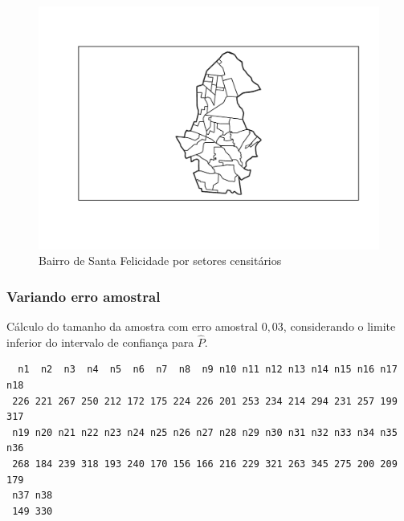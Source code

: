 \documentclass[12pt]{article}\usepackage[]{graphicx}\usepackage[]{color}
\makeatletter
\newenvironment{kframe}{%
 \def\at@end@of@kframe{}%
 \ifinner\ifhmode%
  \def\at@end@of@kframe{\end{minipage}}%
  \begin{minipage}{\columnwidth}%
 \fi\fi%
 \def\FrameCommand##1{\hskip\@totalleftmargin \hskip-\fboxsep
 \colorbox{shadecolor}{##1}\hskip-\fboxsep
     \hskip-\linewidth \hskip-\@totalleftmargin \hskip\columnwidth}%
 \MakeFramed {\advance\hsize-\width
   \@totalleftmargin\z@ \linewidth\hsize
   \@setminipage}}%
 {\par\unskip\endMakeFramed%
 \at@end@of@kframe}
\newenvironment{knitrout}{}{} %
\makeatother
\begin{document}
\begin{knitrout}\footnotesize
{}\color{fgcolor}\begin{figure}[H]

{\centering \includegraphics[width=1\linewidth]{figure/plot1-1} 

}

\caption[Bairro de Santa Felicidade 
 por setores censitários]{Bairro de Santa Felicidade 
 por setores censitários}\label{fig:plot1}
\end{figure}


\end{knitrout}
\indent



\subsubsection{Variando erro amostral}
\indent

Cálculo do tamanho da amostra com erro amostral $0,03$, considerando o limite
inferior do intervalo de confiança para $\hat{P}$.
\indent





\begin{knitrout}\footnotesize
{}\color{fgcolor}\begin{kframe}
\begin{verbatim}
  n1  n2  n3  n4  n5  n6  n7  n8  n9 n10 n11 n12 n13 n14 n15 n16 n17 n18
 226 221 267 250 212 172 175 224 226 201 253 234 214 294 231 257 199 317
 n19 n20 n21 n22 n23 n24 n25 n26 n27 n28 n29 n30 n31 n32 n33 n34 n35 n36
 268 184 239 318 193 240 170 156 166 216 229 321 263 345 275 200 209 179
 n37 n38
 149 330
\end{verbatim}
\end{kframe}
\end{knitrout}
\end{document}
